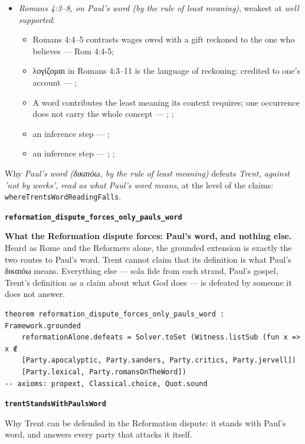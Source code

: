 \documentclass[11pt]{article}
\begin{document}
\begin{itemize}
\begin{itemize}
\end{itemize}
\item \emph{Romans 4:3–8, on Paul's word (by the rule of least meaning)}, weakest at \emph{well supported}:
\begin{itemize}
\item Romans 4:4–5 contrasts wages owed with a gift reckoned to the one who believes --- Rom 4:4-5; \cite[III.xi.18]{calvin-institutes-1960}
\item λογίζομαι in Romans 4:3–11 is the language of reckoning: credited to one's account --- \cite[s.v. λογίζομαι]{bauer-danker-lexicon-2000}; \cite[ad loc. Rom 4:3]{moo-romans-1996}
\item A word contributes the least meaning its context requires; one occurrence does not carry the whole concept --- \cite{silva-biblical-words-1994}; \cite{joos-semantic-axiom-1972}; \cite{barr-semantics-2004}
\item an inference step --- \cite[ad loc. Rom 4:6]{moo-romans-1996}; \cite[s.v. λογίζομαι]{bauer-danker-lexicon-2000}
\item an inference step --- \cite{silva-biblical-words-1994}; \cite[p. 80]{moo-romans-1996}; \cite{barr-semantics-2004}
\end{itemize}
\end{itemize}
\noindent Why \emph{Paul's word (δικαιόω, by the rule of least meaning)} defeats \emph{Trent, against 'not by works', read as what Paul's word means}, at the level of the claims: \texttt{where\allowbreak{}Trents\allowbreak{}Word\allowbreak{}Reading\allowbreak{}Falls}.
\par\medskip\noindent\textbf{\texttt{reformation\_\allowbreak{}dispute\_\allowbreak{}forces\_\allowbreak{}only\_\allowbreak{}pauls\_\allowbreak{}word}}\par\nobreak\noindent
\textbf{What the Reformation dispute forces: Paul's word, and nothing else.} Heard as Rome and the Reformers alone, the grounded extension is exactly the two routes to Paul's word. Trent cannot claim that its definition is what Paul's δικαιόω means. Everything else — sola fide from each strand, Paul's gospel, Trent's definition as a claim about what God does — is defeated by someone it does not answer.

{\small\begin{verbatim}
theorem reformation_dispute_forces_only_pauls_word : Framework.grounded
    reformationAlone.defeats = Solver.toSet (Witness.listSub (fun x => x ∉
    [Party.apocalyptic, Party.sanders, Party.critics, Party.jervell])
    [Party.lexical, Party.romansOnTheWord])
-- axioms: propext, Classical.choice, Quot.sound
\end{verbatim}}
\par\medskip\noindent\textbf{\texttt{trent\allowbreak{}Stands\allowbreak{}With\allowbreak{}Pauls\allowbreak{}Word}}\par\nobreak\noindent
Why Trent can be defended in the Reformation dispute: it stands with Paul's word, and answers every party that attacks it itself.
\end{document}
